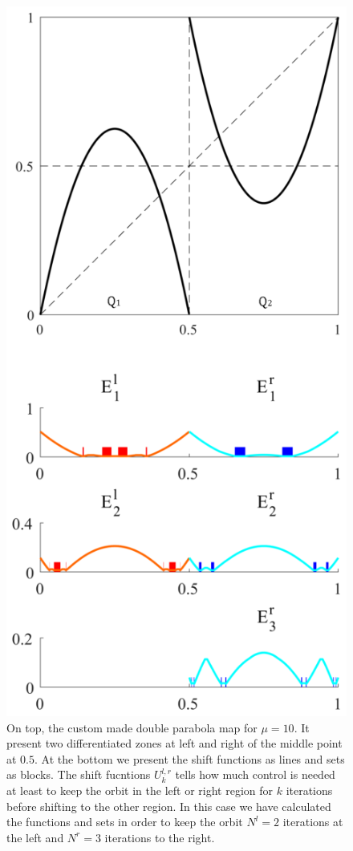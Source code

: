 \begin{figure}
    \centering
    \includegraphics[width=0.4\textheight]{Images/P1/Alt_sets.eps}
    \caption{On top, the custom made double parabola map for $\mu = 10$. It present two differentiated zones at left and right of the middle point at $0.5$. At the bottom we present the shift functions as lines and sets as blocks. The shift fucntions $U^{l,r}_k$ tells how much control is needed at least to keep the orbit in the left or right region for $k$ iterations before shifting to the other region. In this case we have calculated the functions and sets in order to keep the orbit $N^l = 2$ iterations at the left and $N^r = 3$ iterations to the right.}
    \label{fig:ShiftSets}
\end{figure}





